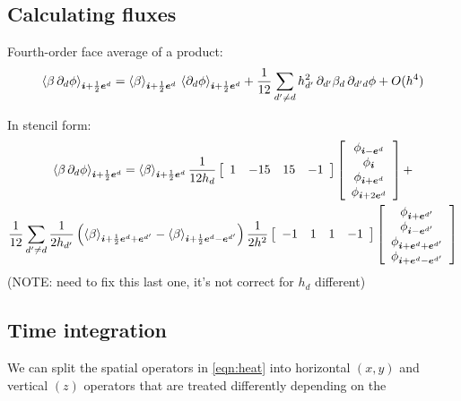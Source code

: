 \documentclass[11pt]{article}
\begin{document}
\subsection{Calculating fluxes}

Fourth-order face average of a product:
\begin{equation}
  \left\langle \beta \, \partial_d \phi \right\rangle_{{\boldsymbol{i}}+\frac{1}{2}{\boldsymbol{e}}^d} = \left\langle \beta \right\rangle_{{\boldsymbol{i}}+\frac{1}{2}{\boldsymbol{e}}^d} \, \left\langle \partial_d \phi \right\rangle_{{\boldsymbol{i}}+\frac{1}{2}{\boldsymbol{e}}^d} + 
  \frac{1}{12}\sum_{d'\neq d}
  h_{d'}^2 \, {\partial_{d'} \beta_d} \, {\partial_{d' d} \phi}  +
  O(h^4) \\
\end{equation}

In stencil form:
\begin{gather*}
\left\langle \beta \, \partial_d \phi \right\rangle_{{{\boldsymbol{i}}+\frac{1}{2}{\boldsymbol{e}}^d}} = 
\left\langle \beta \right\rangle_{{\boldsymbol{i}}+\frac{1}{2}{\boldsymbol{e}}^d}
\frac{1}{12 h_d}
\left[ 
  \begin{array}{cccc}
    1  &  -15  &  15  &  -1  
  \end{array} 
\right] 
\left[ 
  \begin{array}{c}
    \phi_{{\boldsymbol{i}} - {\boldsymbol{e}^d}} \\
    \phi_{{\boldsymbol{i}} } \\
    \phi_{{\boldsymbol{i}} + {\boldsymbol{e}^d}} \\
    \phi_{{\boldsymbol{i}} + 2{\boldsymbol{e}^d}} \\
  \end{array} 
\right]
 + 
\\
\frac{1}{12}
\sum_{d'\neq d}
\frac{1}{2 h_{d'}} 
\left( 
    \left\langle \beta \right\rangle_{{{\boldsymbol{i}}+\frac{1}{2}{\boldsymbol{e}}^d} + {\boldsymbol{e}}^{d'}} - 
    \left\langle \beta \right\rangle_{{{\boldsymbol{i}}+\frac{1}{2}{\boldsymbol{e}}^d} - {\boldsymbol{e}}^{d'}} 
\right)
 \frac{1}{2 h^2} 
\left[ 
  \begin{array}{cccc}
    -1  &  1  &  1  &  -1
  \end{array} 
\right] 
\left[ 
  \begin{array}{c}
    \phi_{{\boldsymbol{i}}       + {\boldsymbol{e}}^{d'}} \\
    \phi_{{\boldsymbol{i}}       - {\boldsymbol{e}}^{d'}} \\
    \phi_{{\boldsymbol{i}} + {\boldsymbol{e}^d} + {\boldsymbol{e}}^{d'}} \\
    \phi_{{\boldsymbol{i}} + {\boldsymbol{e}^d} - {\boldsymbol{e}}^{d'}}
  \end{array} 
\right]
\end{gather*}
(NOTE: need to fix this last one, it's not correct for $h_d$ different)

\subsection{Time integration}

We can split the spatial operators in \eqref{eqn:heat} into horizontal $(x,y)$ and
vertical $(z)$ operators that are treated differently depending on the 
\end{document}
